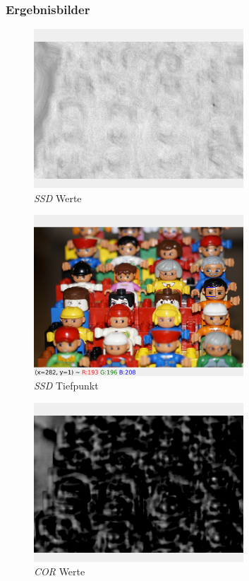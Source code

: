 \documentclass[12pt]{article}
\begin{document}
\subsubsection*{Ergebnisbilder}
\begin{figure}[H]
  \centering
  \includegraphics[width=0.7\textwidth, keepaspectratio]{ssd_values.png}\\
  \textit{SSD} Werte
\end{figure}
\begin{figure}[H]
  \centering
  \includegraphics[width=0.7\textwidth, keepaspectratio]{ssd_match.png}\\
  \textit{SSD} Tiefpunkt
\end{figure}
\begin{figure}[H]
  \centering
  \includegraphics[width=0.7\textwidth, keepaspectratio]{cor_values.png}\\
  \textit{COR} Werte
\end{figure}
\end{document}
